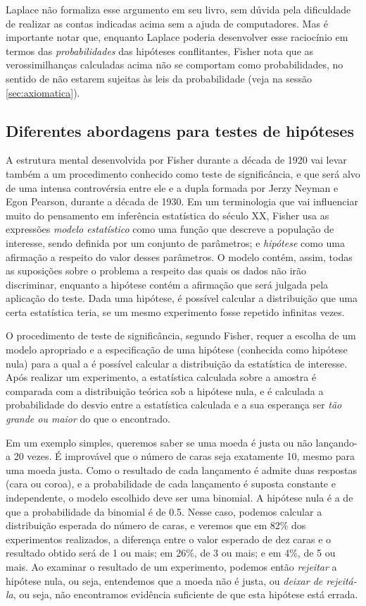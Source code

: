 Laplace não formaliza esse argumento em seu livro, sem dúvida pela dificuldade de realizar as contas indicadas acima sem
a ajuda de computadores. Mas é importante notar que, enquanto Laplace poderia desenvolver esse raciocínio em termos das 
{\em probabilidades} das hipóteses conflitantes, Fisher nota que as verossimilhanças calculadas acima não se comportam como 
probabilidades, no sentido de não estarem sujeitas às leis da probabilidade (veja na sessão \ref{sec:axiomatica}).

\subsection{Diferentes abordagens para testes de hipóteses}

A estrutura mental desenvolvida por Fisher durante a década de 1920 vai levar também a um procedimento conhecido como teste de 
significância, e que será alvo de uma intensa controvérsia entre ele e a dupla formada por Jerzy Neyman e Egon Pearson, 
durante a década de 1930. Em um terminologia que vai influenciar muito do pensamento em inferência estatística do século XX,
Fisher usa as expressões {\em modelo estatístico} como uma função que descreve a população de interesse, sendo definida 
por um conjunto de parâmetros; e {\em hipótese} como uma afirmação a respeito do valor desses parâmetros. O modelo contém, 
assim, todas as suposições sobre o problema a respeito das quais os dados não irão discriminar, enquanto a hipótese
contém a afirmação que será julgada pela aplicação do teste. Dada uma hipótese, é possível
calcular a distribuição que uma certa estatística teria, se um mesmo experimento fosse repetido infinitas vezes.

O procedimento de teste de significância, segundo Fisher, requer a escolha de um modelo apropriado e a especificação de uma 
hipótese (conhecida como hipótese nula) para a qual a é possível calcular a distribuição da estatística de interesse. 
Após realizar um experimento, a estatística calculada sobre a amostra é comparada com a distribuição teórica sob a hipótese nula,
e é calculada a probabilidade do desvio entre a estatística calculada e a sua esperança ser {\em tão grande ou maior} do que o
encontrado. 

Em um exemplo simples, queremos saber se uma moeda é justa ou não lançando-a 20 vezes. É improvável que o número de caras seja
exatamente 10, mesmo para uma moeda justa. Como o resultado de cada lançamento é
admite duas	respostas (cara ou coroa), e a probabilidade de cada lançamento é suposta constante e independente, o modelo escolhido
deve ser uma binomial. A hipótese nula é a de que a probabilidade da binomial é de 0.5. Nesse caso, podemos calcular a 
distribuição esperada do número de caras, e veremos que em 82\% dos experimentos realizados, a diferença entre o valor esperado
de dez caras e o resultado obtido será de 1 ou mais; em 26\%, de 3 ou mais; e em 4\%, de 5 ou mais. Ao examinar o resultado 
de um experimento, podemos então {\em rejeitar} a hipótese nula, ou seja, entendemos que a moeda não é justa, ou {\em deixar
de rejeitá-la}, ou seja, não encontramos evidência suficiente de que esta hipótese está errada.

